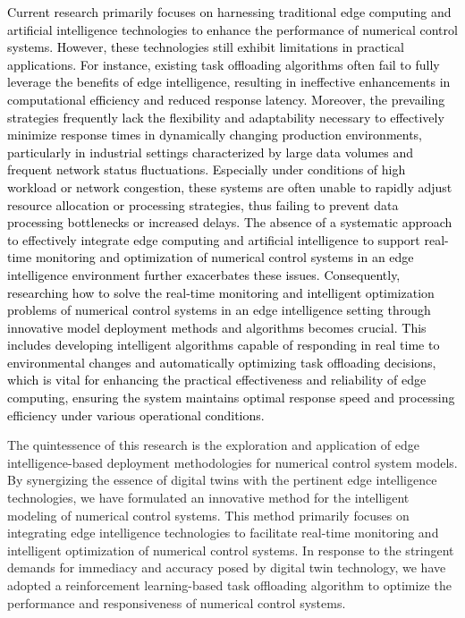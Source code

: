\documentclass[preprint,12pt]{elsarticle}
\begin{document}
\textcolor{black}{Current research primarily focuses on harnessing traditional edge computing and artificial intelligence technologies to enhance the performance of numerical control systems. However, these technologies still exhibit limitations in practical applications. For instance, existing task offloading algorithms often fail to fully leverage the benefits of edge intelligence, resulting in ineffective enhancements in computational efficiency and reduced response latency\cite{hortelano2023comprehensive}. Moreover, the prevailing strategies frequently lack the flexibility and adaptability necessary to effectively minimize response times in dynamically changing production environments, particularly in industrial settings characterized by large data volumes and frequent network status fluctuations\cite{acheampong2023review}. Especially under conditions of high workload or network congestion, these systems are often unable to rapidly adjust resource allocation or processing strategies, thus failing to prevent data processing bottlenecks or increased delays. The absence of a systematic approach to effectively integrate edge computing and artificial intelligence to support real-time monitoring and optimization of numerical control systems in an edge intelligence environment further exacerbates these issues\cite{kristiani2024intelligent}. Consequently, researching how to solve the real-time monitoring and intelligent optimization problems of numerical control systems in an edge intelligence setting through innovative model deployment methods and algorithms becomes crucial. This includes developing intelligent algorithms capable of responding in real time to environmental changes and automatically optimizing task offloading decisions, which is vital for enhancing the practical effectiveness and reliability of edge computing, ensuring the system maintains optimal response speed and processing efficiency under various operational conditions.}

The quintessence of this research is the exploration and application of edge intelligence-based deployment methodologies for numerical control system models. By synergizing the essence of digital twins with the pertinent edge intelligence technologies, we have formulated an innovative method for the intelligent modeling of numerical control systems. This method primarily focuses on integrating edge intelligence technologies to facilitate real-time monitoring and intelligent optimization of numerical control systems. In response to the stringent demands for immediacy and accuracy posed by digital twin technology, we have adopted a reinforcement learning-based task offloading algorithm to optimize the performance and responsiveness of numerical control systems.
\end{document}
